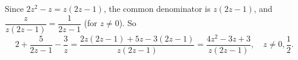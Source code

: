 Since $2z^2-z=z(2z-1)$, the common denominator is $z(2z-1)$, and $\dfrac z{z(2z-1)}=\dfrac1{2z-1}$ (for $z\ne0$). So
\[2+\dfrac5{2z-1}-\dfrac3z=\dfrac{2z(2z-1)+5z-3(2z-1)}{z(2z-1)}=\boxed{\dfrac{4z^2-3z+3}{z(2z-1)}},\quad z\ne0,\dfrac12.\]
